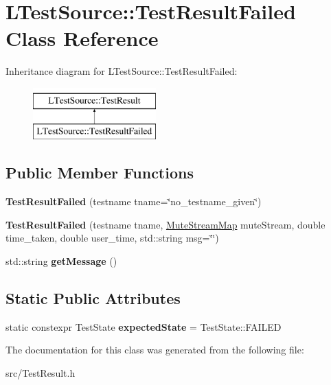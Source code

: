 \hypertarget{class_l_test_source_1_1_test_result_failed}{\section{L\-Test\-Source\-:\-:Test\-Result\-Failed Class Reference}
\label{class_l_test_source_1_1_test_result_failed}
}
Inheritance diagram for L\-Test\-Source\-:\-:Test\-Result\-Failed\-:\begin{figure}[H]
\begin{center}
\leavevmode
\includegraphics[height=2.000000cm]{class_l_test_source_1_1_test_result_failed}
\end{center}
\end{figure}
\subsection*{Public Member Functions}
\begin{DoxyCompactItemize}
\item 
\hypertarget{class_l_test_source_1_1_test_result_failed_a63f590f6e42d5a82bafaa4429850f469}{{\bfseries Test\-Result\-Failed} (testname tname=\char`\"{}no\-\_\-testname\-\_\-given\char`\"{})}\label{class_l_test_source_1_1_test_result_failed_a63f590f6e42d5a82bafaa4429850f469}

\item 
\hypertarget{class_l_test_source_1_1_test_result_failed_afe2d9a9d1d101090b0b8c22bdc396318}{{\bfseries Test\-Result\-Failed} (testname tname, \hyperlink{class_l_test_source_1_1_mute_stream_map}{Mute\-Stream\-Map} mute\-Stream, double time\-\_\-taken, double user\-\_\-time, std\-::string msg=\char`\"{}\char`\"{})}\label{class_l_test_source_1_1_test_result_failed_afe2d9a9d1d101090b0b8c22bdc396318}

\item 
\hypertarget{class_l_test_source_1_1_test_result_failed_a92c2542cef1e8bf9c33b35a63c6f5f33}{std\-::string {\bfseries get\-Message} ()}\label{class_l_test_source_1_1_test_result_failed_a92c2542cef1e8bf9c33b35a63c6f5f33}

\end{DoxyCompactItemize}
\subsection*{Static Public Attributes}
\begin{DoxyCompactItemize}
\item 
\hypertarget{class_l_test_source_1_1_test_result_failed_ab50748353cc6ff8842911b4bc1b4fa2f}{static constexpr Test\-State {\bfseries expected\-State} = Test\-State\-::\-F\-A\-I\-L\-E\-D}\label{class_l_test_source_1_1_test_result_failed_ab50748353cc6ff8842911b4bc1b4fa2f}

\end{DoxyCompactItemize}


The documentation for this class was generated from the following file\-:\begin{DoxyCompactItemize}
\item 
src/Test\-Result.\-h\end{DoxyCompactItemize}
